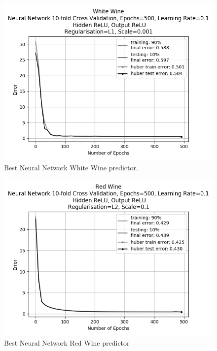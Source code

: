 \documentclass[10pt,twocolumn,letterpaper]{article}
\begin{document}
\begin{figure}[h]
	\begin{center}
		\includegraphics[width=0.9\linewidth]{img/best_white_nn.png}
	\end{center}
	\caption{Best Neural Network White Wine predictor.}
	\label{fig:wwbest}
\end{figure}

\begin{figure}[h]
	\begin{center}
		\includegraphics[width=0.9\linewidth]{img/best_red_nn.png}
	\end{center}
	\caption{Best Neural Network Red Wine predictor}
	\label{fig:rwbest}
\end{figure}
\end{document}
